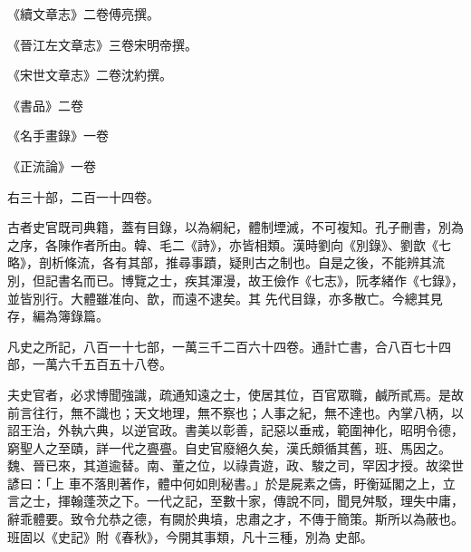 \begin{pinyinscope}
 《續文章志》二卷傅亮撰。



 《晉江左文章志》三卷宋明帝撰。



 《宋世文章志》二卷沈約撰。



 《書品》二卷



 《名手畫錄》一卷



 《正流論》一卷



 右三十部，二百一十四卷。



 古者史官既司典籍，蓋有目錄，以為綱紀，體制堙滅，不可複知。孔子刪書，別為之序，各陳作者所由。韓、毛二《詩》，亦皆相類。漢時劉向《別錄》、劉歆《七略》，剖析條流，各有其部，推尋事蹟，疑則古之制也。自是之後，不能辨其流別，但記書名而已。博覽之士，疾其渾漫，故王儉作《七志》，阮孝緒作《七錄》，並皆別行。大體雖准向、歆，而遠不逮矣。其
 先代目錄，亦多散亡。今總其見存，編為簿錄篇。



 凡史之所記，八百一十七部，一萬三千二百六十四卷。通計亡書，合八百七十四部，一萬六千五百五十八卷。



 夫史官者，必求博聞強識，疏通知遠之士，使居其位，百官眾職，鹹所貳焉。是故前言往行，無不識也；天文地理，無不察也；人事之紀，無不達也。內掌八柄，以詔王治，外執六典，以逆官政。書美以彰善，記惡以垂戒，範圍神化，昭明令德，窮聖人之至賾，詳一代之亹亹。自史官廢絕久矣，漢氏頗循其舊，班、馬因之。魏、晉已來，其道逾替。南、董之位，以祿貴遊，政、駿之司，罕因才授。故梁世諺曰：「上
 車不落則著作，體中何如則秘書。」於是屍素之儔，盱衡延閣之上，立言之士，揮翰蓬茨之下。一代之記，至數十家，傳說不同，聞見舛駁，理失中庸，辭乖體要。致令允恭之德，有闕於典墳，忠肅之才，不傳于簡策。斯所以為蔽也。班固以《史記》附《春秋》，今開其事類，凡十三種，別為
 史部。



\end{pinyinscope}